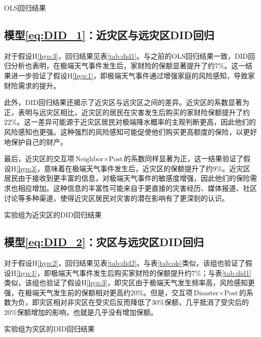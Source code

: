 \begin{table}[htbp]
    \centering
    \caption{OLS回归结果}\label{tab:ols}
    
\end{table}

\subsection{模型\ref{eq:DID_1}：近灾区与远灾区DID回归}
对于假设H\ref{hyp:3}，回归结果见表\ref{tab:did1}。与之前的OLS回归结果一致，DID回归分析也表明，在极端天气事件发生后，家财险的保额显著提升了约7\%。这一结果进一步验证了假设H\ref{hyp:1}，即极端天气事件通过增强家庭的风险感知，导致家财险需求的提升。

此外，DID回归结果还揭示了近灾区与远灾区之间的差异。近灾区的系数显著为正，表明与远灾区相比，近灾区的居民在灾害发生后购买的家财险保额提升了约22\%。这一差异可能源于近灾区居民对极端降水概率的主观判断更高，因此他们的风险感知也更强。这种强烈的风险感知可能促使他们购买更高额度的保险，以更好地保护自己的财产。

最后，近灾区的交互项$\text{Neighbor}\times \text{Post}$的系数同样显著为正，这一结果验证了假设H\ref{hyp:3}，意味着在极端天气事件发生后，近灾区的保额提升了约9\%。近灾区居民由于接收到更丰富的信息，对极端天气事件的敏感度增强，因此他们的保险需求也相应增加。这种信息的丰富性可能来自于更直接的灾害经历、媒体报道、社区讨论等多种渠道，使得近灾区居民对灾害的潜在影响有了更深刻的认识。

\begin{table}[htbp]
    \centering
    \caption{实验组为近灾区的DID回归结果}\label{tab:did1}
    
\end{table}

\subsection{模型\ref{eq:DID_2}：灾区与远灾区DID回归}
对于假设H\ref{hyp:2}，回归结果见表\ref{tab:did2}。与表\ref{tab:ols}类似，该组也验证了假设H\ref{hyp:1}，即极端天气事件发生后购买家财险的保额提升约7\%；与表\ref{tab:did1}类似，该组也验证了假设H\ref{hyp:3}，即灾区由于极端天气发生频率高，风险感知更强，在极端天气发生前的保额相对更高约20\%。但是，交互项$\text{Disaster}\times \text{Post}$的系数为负，即灾区相对非灾区在受灾后反而降低了30\%保额，几乎抵消了受灾后的20\%保额增加的影响，也就是几乎没有增加保额。
\begin{table}[htbp]
    \centering
    \caption{实验组为灾区的DID回归结果}\label{tab:did2}
    
\end{table}

